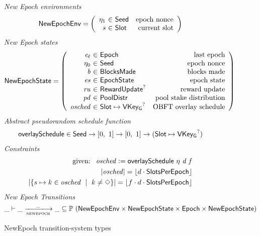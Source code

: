 \begin{figure}
  \emph{New Epoch environments}
  \begin{equation*}
    \NewEpochEnv =
    \left(
      \begin{array}{r@{~\in~}lr}
        \eta_1 & \Seed & \text{epoch nonce} \\
        \var{s} & \Slot & \text{current slot}
      \end{array}
    \right)
  \end{equation*}
  \emph{New Epoch states}
  \begin{equation*}
    \NewEpochState =
    \left(
      \begin{array}{r@{~\in~}lr}
        \var{e_\ell} & \Epoch & \text{last epoch} \\
        \eta_0 & \Seed & \text{epoch nonce} \\
        \var{b} & \BlocksMade & \text{blocks made} \\
        \var{es} & \EpochState & \text{epoch state} \\
        \var{ru} & \RewardUpdate^? & \text{reward update} \\
        \var{pd} & \PoolDistr & \text{pool stake distribution} \\
        \var{osched} & \Slot\mapsto\VKeyGen^? & \text{OBFT overlay schedule} \\
      \end{array}
    \right)
  \end{equation*}
  \emph{Abstract pseudorandom schedule function}
  \begin{align*}
    & \mathsf{overlaySchedule} \in \mathsf{Seed} \to [0,~1] \to [0,~1] \to
      (\mathsf{Slot}\mapsto\mathsf{VKey_G}^?) \\
  \end{align*}
  \emph{Constraints}
  \begin{align*}
    \text{ given: }~\mathit{osched}\mathrel{\mathop:}=\mathsf{overlaySchedule}~\eta~\mathit{d}~\mathit{f} \\
    |\mathit{osched}| = \lfloor d\cdot\mathsf{SlotsPerEpoch}\rfloor \\
    |\{s\mapsto k\in\mathit{osched}~\mid~k\neq\Diamond\}| = \lfloor f\cdot d\cdot\mathsf{SlotsPerEpoch}\rfloor \\
  \end{align*}
  \emph{New Epoch Transitions}
  \begin{equation*}
    \_ \vdash \var{\_} \trans{newepoch}{\_} \var{\_} \subseteq
    \powerset (\NewEpochEnv \times \NewEpochState \times \Epoch \times \NewEpochState)
  \end{equation*}
  \caption{NewEpoch transition-system types}
  \label{fig:ts-types:newepoch}
\end{figure}

